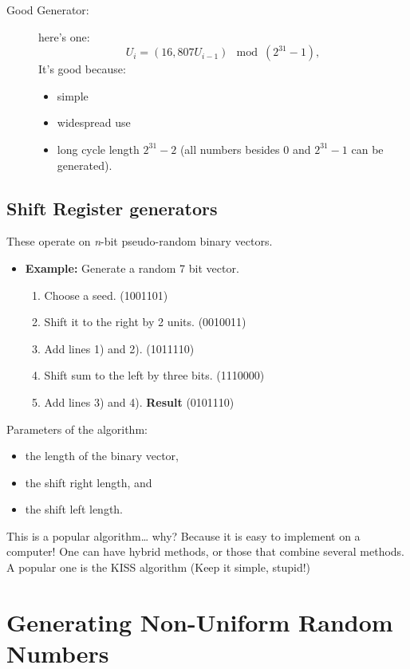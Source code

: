 \documentclass[captions=tableheading]{scrbook}
\begin{document}
\vspace{1in}


\begin{description}
\item[Good Generator:] here's one: 
  \[
  U_{i}=(16,807U_{i-1})\mod(2^{31}-1),
  \]
  It's good because:
\begin{itemize}
\item simple
\item widespread use
\item long cycle length $2^{31}-2$ (all numbers besides 0 and $2^{31}-1$ can be generated).
\end{itemize}
\end{description}
\subsection{Shift Register generators}
\label{sec-2_2_2}

These operate on \emph{n}-bit pseudo-random binary vectors.

\begin{itemize}
\item \textbf{Example:} Generate a random 7 bit vector.
\begin{enumerate}
\item Choose a seed. (1001101)
\item Shift it to the right by 2 units. (0010011)
\item Add lines 1) and 2). (1011110)
\item Shift sum to the left by three bits. (1110000)
\item Add lines 3) and 4). \textbf{Result} (0101110)
\end{enumerate}
\end{itemize}

Parameters of the algorithm: 

\begin{itemize}
\item the length of the binary vector,
\item the shift right length, and
\item the shift left length.
\end{itemize}

This is a popular algorithm\ldots{} why? Because it is easy to implement on a computer! One can have hybrid methods, or those that combine several methods. A popular one is the KISS algorithm (Keep it simple, stupid!)
\section{Generating Non-Uniform Random Numbers}
\label{sec-2_3}
\end{document}

